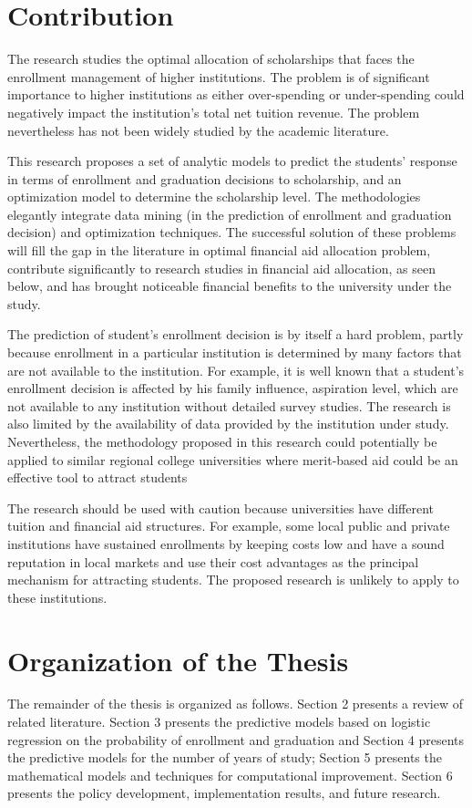 \documentclass[12pt,english]{report}
\begin{document}
\section{Contribution}

The research studies the optimal allocation of scholarships that faces the
enrollment management of higher institutions.  The problem is of significant
importance to higher institutions as either over-spending or under-spending
could negatively impact the institution's total net tuition revenue.  The
problem nevertheless has not been widely studied by the academic literature.

This research proposes a set of analytic models to predict the students'
response in terms of enrollment and graduation decisions to scholarship, and
an optimization model to determine the scholarship level.  The methodologies
elegantly integrate data mining (in the prediction of enrollment and 
graduation decision) and optimization techniques. The successful solution of
these problems will fill the gap in the literature in optimal financial aid
allocation problem, contribute significantly to research studies in financial
aid allocation, as seen below, and has brought noticeable financial benefits to
the university under the study.

The prediction of student's enrollment decision is by itself a hard problem,
partly because enrollment in a particular institution is determined
by many factors that are not available to the institution.  For example, it is
well known that a student's enrollment decision is affected by his family
influence, aspiration level, which are not available to any institution without
detailed survey studies.  The research is also limited by the availability of
data provided by the institution under study.   Nevertheless, the methodology
proposed in this research could potentially be applied to similar regional
college universities where merit-based aid could be an effective tool to
attract students

The research should be used with caution because universities have different
tuition and financial aid structures.  For example, some local public and
private institutions have sustained enrollments by keeping costs low and have a
sound reputation in local markets and use their cost advantages as the
principal mechanism for attracting students.  The proposed research is unlikely
to apply to these institutions.

\section{Organization of the Thesis}
\vspace{0.25in}
The remainder of the thesis is organized as follows. Section 2 presents a
review of related literature. Section 3 presents the predictive models based on
logistic regression on the probability of enrollment and graduation and Section
4 presents the predictive models for the number of years of study; Section 5
presents the mathematical models and techniques for computational improvement.
Section 6 presents the policy development, implementation results, and future
research.
\end{document}
